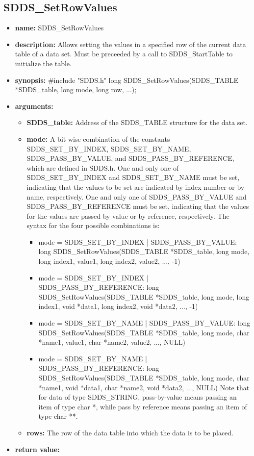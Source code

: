 \documentclass[11pt]{article}
\begin{document}
\subsection{SDDS\_SetRowValues}
\label{SDDS_SetRowValues}

\begin{itemize}
\item {\bf name:}\newline
SDDS\_SetRowValues
\item {\bf description:}\newline
Allows setting the values in a specified row of the current data table of a data set. Must be preceeded by a call to SDDS\_StartTable to initialize the table.
\item {\bf synopsis:} \#include "SDDS.h"\newline
long SDDS\_SetRowValues(SDDS\_TABLE *SDDS\_table, long mode, long row, ...);
\item {\bf arguments:}
\begin{itemize}
\item {\bf SDDS\_table:} Address of the SDDS\_TABLE structure for the data set.
\item {\bf mode:} A bit-wise combination of the constants SDDS\_SET\_BY\_INDEX, SDDS\_SET\_BY\_NAME, SDDS\_PASS\_BY\_VALUE, and SDDS\_PASS\_BY\_REFERENCE, which are defined in  SDDS.h. One and only one of SDDS\_SET\_BY\_INDEX and SDDS\_SET\_BY\_NAME must be set, indicating that the values to be set are indicated by index number or by name, respectively. One and only one of SDDS\_PASS\_BY\_VALUE and SDDS\_PASS\_BY\_REFERENCE must be set, indicating that the values for the values are passed by value or by reference, respectively. The syntax for the four possible combinations is:
\begin{itemize}
\item mode = SDDS\_SET\_BY\_INDEX | SDDS\_PASS\_BY\_VALUE: long SDDS\_SetRowValues(SDDS\_TABLE *SDDS\_table, long mode, long index1,  value1, long index2,  value2, ..., -1)
\item mode = SDDS\_SET\_BY\_INDEX | SDDS\_PASS\_BY\_REFERENCE: long SDDS\_SetRowValues(SDDS\_TABLE *SDDS\_table, long mode, long index1, void *data1, long index2, void *data2, ..., -1)
\item mode = SDDS\_SET\_BY\_NAME | SDDS\_PASS\_BY\_VALUE: long SDDS\_SetRowValues(SDDS\_TABLE *SDDS\_table, long mode, char *name1,  value1, char *name2,  value2, ..., NULL)
\item mode = SDDS\_SET\_BY\_NAME | SDDS\_PASS\_BY\_REFERENCE: long SDDS\_SetRowValues(SDDS\_TABLE *SDDS\_table, long mode, char *name1, void *data1, char *name2, void *data2, ..., NULL) Note that for data of type SDDS\_STRING, pass-by-value means passing an item of type char *, while pass by reference means passing an item of type char **.
\end{itemize}
\item {\bf rows:} The row of the data table into which the data is to be placed.
\end{itemize}
\item {\bf return value:}\newline


\end{itemize}
\end{document}
